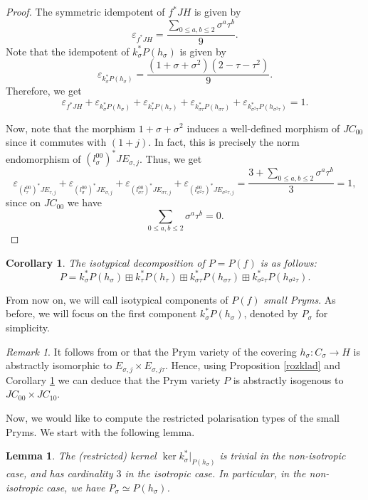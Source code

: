 \documentclass{amsart}
\newtheorem{cor}[thm]{Corollary}
\newtheorem{lem}[thm]{Lemma}
\theoremstyle{remark}
\newtheorem{rem}[thm]{Remark}
\numberwithin{equation}{section}
\newcommand{\s}{\sigma}
\begin{document}
\begin{proof}
    
    The symmetric idempotent of $f^*JH$ is given by $$\varepsilon_{f^*JH} = \frac{\sum_{0\leq a,b \leq 2}\sigma^a\tau^b}{9}.$$ Note that the idempotent of $k_{\sigma}^*P(h_{\sigma})$ is given by $$\varepsilon_{k_{\sigma}^*P(h_{\sigma})} = \frac{(1 + \sigma + \sigma^2)(2 - \tau - \tau^2)}{9}.$$
    Therefore, we get $$\varepsilon_{f^*JH} + \varepsilon_{k_{\sigma}^*P(h_{\sigma})} + \varepsilon_{k_{\tau}^*P(h_{\tau})} + \varepsilon_{k_{\sigma\tau}^*P(h_{\sigma\tau})} + \varepsilon_{k_{\sigma^2\tau}^*P(h_{\sigma^2\tau})} = 1.$$

    Now, note that the morphism $1 + \sigma + \sigma^2$ induces a well-defined morphism of $JC_{00}$ since it commutes with $(1 + j)$. In fact, this is precisely the norm endomorphism of $(l_{\sigma}^{00})^*JE_{\sigma,j}$.
    Thus, we get $$\varepsilon_{(l_{\tau}^{00})^*JE_{\tau, j}} + \varepsilon_{(l_{\sigma}^{00})^*JE_{\sigma, j}} + \varepsilon_{(l_{\sigma\tau}^{00})^*JE_{\sigma\tau, j}} + \varepsilon_{(l_{\sigma^2\tau}^{00})^*JE_{\sigma^2\tau, j}} = \frac{3 + \sum_{0 \leq a,b \leq 2}\sigma^a\tau^b}{3} = 1,$$ since on $JC_{00}$ we have $$\sum_{0\leq a,b \leq 2}\sigma^a\tau^b = 0.$$ 
\end{proof}

\begin{cor}
\label{decprym}
    The isotypical decomposition of $P=P(f)$ is as follows:
    $$P = k_{\sigma}^*P(h_{\sigma}) \boxplus k_{\tau}^*P(h_{\tau}) \boxplus k_{\sigma\tau}^*P(h_{\sigma\tau}) \boxplus  k_{\sigma^2\tau}^*P(h_{\sigma^2\tau}).$$
\end{cor}
From now on, we will call isotypical components of $P(f)$ \textit{small Pryms}. 
As before, we will focus on the first component $k_{\sigma}^*P(h_{\sigma})$, denoted by $P_\s$ for simplicity.

\begin{rem}
\label{prymisog}
    It follows from \cite[Proposition 2.5]{ortega} or \cite[Theorem 1, page 67]{ries} that the Prym variety of the covering $h_{\sigma}:C_{\sigma} \to H$ is abstractly isomorphic to $E_{\sigma, j} \times E_{\sigma, j\tau}$. Hence, using Proposition \ref{rozklad} and Corollary \ref{decprym} we can deduce that the Prym variety $P$ is abstractly isogenous to $JC_{00} \times JC_{10}$.
\end{rem}

Now, we would like to compute the restricted polarisation types of the small Pryms. We start with the following lemma.
\begin{lem}\label{trivialkernel}
\label{kernel}
    The (restricted) kernel $\ker k_{\sigma}^*|_{P(h_{\sigma})}$ is trivial in the non-isotropic case, and has cardinality $3$ in the isotropic case. In particular, in the non-isotropic case, we have $P_\s\simeq P(h_{\sigma})$.
\end{lem}
\end{document}
